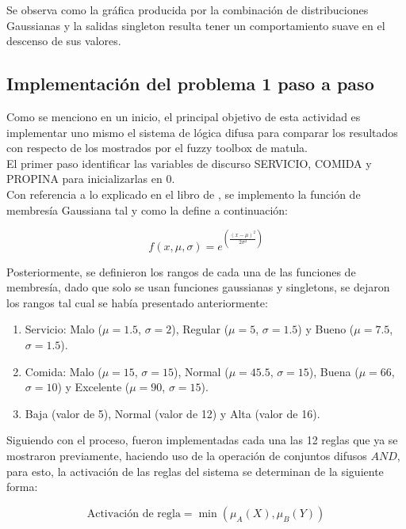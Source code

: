 \documentclass[11pt, letterpaper]{article}
\begin{document}
Se observa como la gráfica producida por la combinación de distribuciones Gaussianas y la salidas singleton resulta tener un comportamiento suave en el descenso de sus valores.

\newpage

\subsection{Implementación del problema 1 paso a paso}

Como se menciono en un inicio, el principal objetivo de esta actividad es implementar uno mismo el sistema de lógica difusa para comparar los resultados con respecto de los mostrados por el fuzzy toolbox de matula.\\

El primer paso  identificar las variables de discurso SERVICIO, COMIDA y PROPINA para inicializarlas en 0.\\

Con referencia a lo explicado en el libro de \cite{Cisneros2004}, se implemento la función de membresía Gaussiana tal y como la define a continuación:

\[
f(x, \mu, \sigma) = e^{\left( \frac{(x - \mu)^2}{2\sigma^2} \right)}
\]

Posteriormente, se definieron los rangos de cada una de las funciones de membresía, dado que solo se usan funciones gaussianas y singletons, se dejaron los rangos tal cual se había presentado anteriormente:

\begin{enumerate}
	\item Servicio: Malo ($\mu = 1.5$, $\sigma = 2$), Regular ($\mu = 5$, $\sigma = 1.5$) y Bueno ($\mu = 7.5$, $\sigma = 1.5$).
	\item Comida: Malo ($\mu = 15$, $\sigma = 15$), Normal ($\mu = 45.5$, $\sigma = 15$), Buena ($\mu = 66$, $\sigma = 10$) y Excelente ($\mu = 90$, $\sigma = 15$).	
	\item Baja (valor de 5), Normal (valor de 12) y Alta (valor de 16).
\end{enumerate} 



Siguiendo con el proceso, fueron implementadas cada una las 12 reglas que ya se mostraron previamente, haciendo uso de la operación de conjuntos difusos $AND$, para esto, la activación de las reglas del sistema se determinan de la siguiente forma:

\[
\text{Activación de regla}  = \min( \mu_A(X), \mu_B(Y) )
\]
\end{document}
